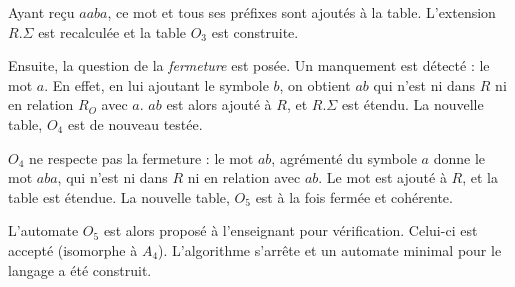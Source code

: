 Ayant reçu $aaba$, ce mot et tous ses préfixes sont ajoutés à la table. L'extension $R.\Sigma$ est recalculée et la table $O_3$ est construite.

Ensuite, la question de la \emph{fermeture} est posée. Un manquement est détecté : le mot $a$. En effet, en lui ajoutant le symbole $b$, on obtient $ab$ qui n'est ni dans $R$ ni en relation $R_O$ avec $a$. $ab$ est alors ajouté à $R$, et $R.\Sigma$ est étendu. La nouvelle table, $O_4$ est de nouveau testée.

$O_4$ ne respecte pas la fermeture : le mot $ab$, agrémenté du symbole $a$ donne le mot $aba$, qui n'est ni dans $R$ ni en relation avec $ab$. Le mot est ajouté à $R$, et la table est étendue. La nouvelle table, $O_5$ est à la fois fermée et cohérente.

L'automate $O_5$ est alors proposé à l'enseignant pour vérification. Celui-ci est accepté (isomorphe à $A_4$). L'algorithme s'arrête et un automate minimal pour le langage a été construit.
